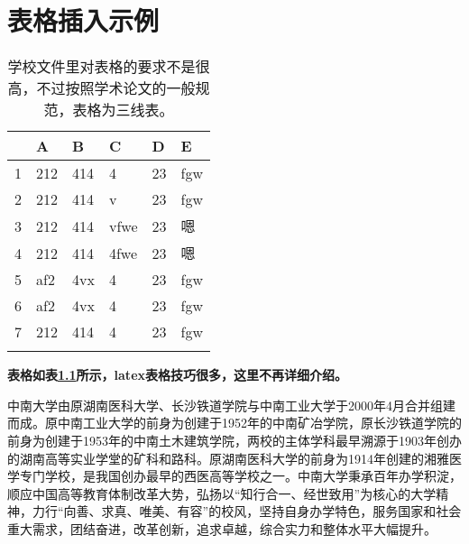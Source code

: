 %
%
%
%
%

\chapter{表格插入示例}

\begin{table}[htb]
  \centering
  \caption{学校文件里对表格的要求不是很高，不过按照学术论文的一般规范，表格为三线表。}
  \label{T.example}
  \begin{tabular}{llllll}
  \hline
   & A  & B  & C  & D  & E \\
  \hline
1 	& 212 & 414 & 4 		& 23 & fgw	\\
2 	& 212 & 414 & v 		& 23 & fgw	\\
3 	& 212 & 414 & vfwe		& 23 & 嗯	\\
4 	& 212 & 414 & 4fwe		& 23 & 嗯	\\
5 	& af2 & 4vx & 4 		& 23 & fgw	\\
6 	& af2 & 4vx & 4 		& 23 & fgw	\\
7 	& 212 & 414 & 4 		& 23 & fgw	\\

\hline{}
\end{tabular}
\end{table}

\textbf{表格如表\ref{T.example}所示，latex表格技巧很多，这里不再详细介绍。}

中南大学由原湖南医科大学、长沙铁道学院与中南工业大学于2000年4月合并组建而成。原中南工业大学的前身为创建于1952年的中南矿冶学院，原长沙铁道学院的前身为创建于1953年的中南土木建筑学院，两校的主体学科最早溯源于1903年创办的湖南高等实业学堂的矿科和路科。原湖南医科大学的前身为1914年创建的湘雅医学专门学校，是我国创办最早的西医高等学校之一。中南大学秉承百年办学积淀，顺应中国高等教育体制改革大势，弘扬以“知行合一、经世致用”为核心的大学精神，力行“向善、求真、唯美、有容”的校风，坚持自身办学特色，服务国家和社会重大需求，团结奋进，改革创新，追求卓越，综合实力和整体水平大幅提升。


\newpage

